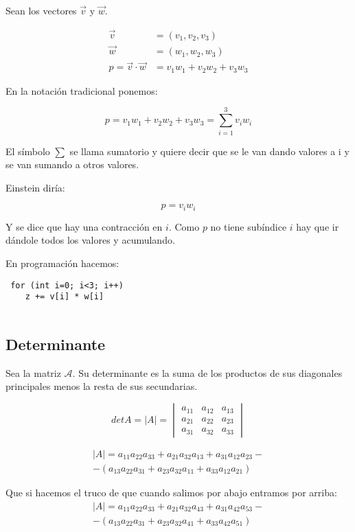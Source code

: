 Sean los vectores $ \vec{v} $ y $ \vec{w} $.

$$
\begin{align*}
\vec{v} &= (v_1, v_2, v_3) \\
\vec{w} &= (w_1, w_2, w_3) \\
p = \vec{v} \cdot \vec{w} &= v_1w_1 + v_2w_2 + v_3w_3
\end{align*}
$$

En la notación tradicional ponemos:

$$ p = v_1w_1 + v_2w_2 + v_3w_3 = \sum_{i=1}^{3} v_iw_i $$

El símbolo $ \sum $ se llama sumatorio y quiere decir que se le van dando 
valores a i y se van sumando a otros valores.

Einstein diría:

$$ p = v_iw_i $$

Y se dice que hay una contracción en $i$. Como $p$ no tiene subíndice $i$ hay 
que ir dándole todos los valores y acumulando.

En programación hacemos:

\begin{lstlisting}
 for (int i=0; i<3; i++)
    z += v[i] * w[i]
    
\end{lstlisting}

\subsection*{Determinante}

Sea la matriz $ \mathcal{A} $. Su determinante es la suma de los productos de sus diagonales principales
menos la resta de sus secundarias.

$$
det A = \left| A \right| = 
\begin{vmatrix}
 a_{11} & a_{12} & a_{13} \\
 a_{21} & a_{22} & a_{23} \\
 a_{31} & a_{32} & a_{33} 
\end{vmatrix}
$$

\begin{multline*}
 \left| A \right| = a_{11}a_{22}a_{33} + a_{21}a_{32}a_{13} + a_{31}a_{12}a_{23} - \\
 - \left( a_{13}a_{22}a_{31} + a_{23}a_{32}a_{11} + a_{33}a_{12}a_{21} \right)
\end{multline*}

Que si hacemos el truco de que cuando salimos por abajo entramos por arriba:
\begin{multline*}
 \left| A \right| = a_{11}a_{22}a_{33} + a_{21}a_{32}a_{43} + a_{31}a_{42}a_{53} - \\
 - \left( a_{13}a_{22}a_{31} + a_{23}a_{32}a_{41} + a_{33}a_{42}a_{51} \right)
\end{multline*}

